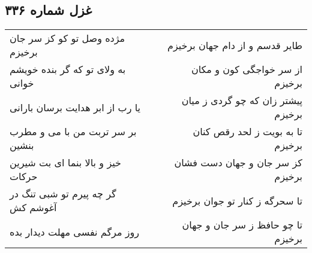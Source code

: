 \begin{center}
\section*{غزل شماره ۳۳۶}
\label{sec:sh336}
\begin{longtable}{l p{0.5cm} r}
مژده وصل تو کو کز سر جان برخیزم
&&
طایر قدسم و از دام جهان برخیزم
\\
به ولای تو که گر بنده خویشم خوانی
&&
از سر خواجگی کون و مکان برخیزم
\\
یا رب از ابر هدایت برسان بارانی
&&
پیشتر زان که چو گردی ز میان برخیزم
\\
بر سر تربت من با می و مطرب بنشین
&&
تا به بویت ز لحد رقص کنان برخیزم
\\
خیز و بالا بنما ای بت شیرین حرکات
&&
کز سر جان و جهان دست فشان برخیزم
\\
گر چه پیرم تو شبی تنگ در آغوشم کش
&&
تا سحرگه ز کنار تو جوان برخیزم
\\
روز مرگم نفسی مهلت دیدار بده
&&
تا چو حافظ ز سر جان و جهان برخیزم
\\
\end{longtable}
\end{center}
